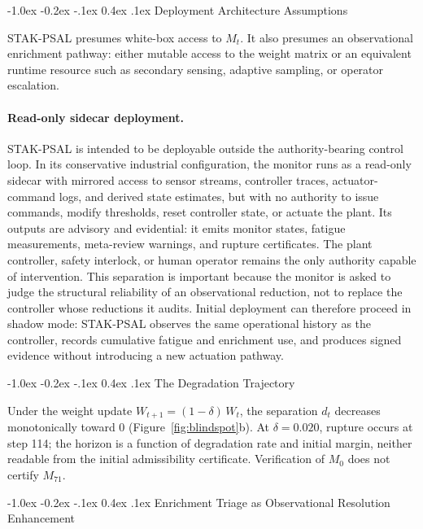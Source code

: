 \documentclass{llncs}
\makeatletter
\renewcommand\subsection{\@startsection{subsection}{2}{\z@}%
  {-1.0ex \@plus -0.2ex \@minus -.1ex}%
  {0.4ex \@plus .1ex}%
  {\normalfont\normalsize\bfseries}}
\makeatother
\begin{document}
\subsection{Deployment Architecture Assumptions}
\label{sec:deploy-assumptions}

STAK-PSAL presumes white-box access to $M_t$. It also presumes an
observational enrichment pathway: either mutable access to the weight
matrix or an equivalent runtime resource such as secondary sensing,
adaptive sampling, or operator escalation.

\paragraph{Read-only sidecar deployment.}
STAK-PSAL is intended to be deployable outside the authority-bearing control loop. In its conservative industrial configuration, the monitor runs as a read-only sidecar with mirrored access to sensor streams, controller traces, actuator-command logs, and derived state estimates, but with no authority to issue commands, modify thresholds, reset controller state, or actuate the plant. Its outputs are advisory and evidential: it emits monitor states, fatigue measurements, meta-review warnings, and rupture certificates. The plant controller, safety interlock, or human operator remains the only authority capable of intervention. This separation is important because the monitor is asked to judge the structural reliability of an observational reduction, not to replace the controller whose reductions it audits. Initial deployment can therefore proceed in shadow mode: STAK-PSAL observes the same operational history as the controller, records cumulative fatigue and enrichment use, and produces signed evidence without introducing a new actuation pathway.

\subsection{The Degradation Trajectory}

Under the weight update $W_{t+1} = (1-\delta)\,W_t$, the separation
$d_t$ decreases monotonically toward 0 (Figure~\ref{fig:blindspot}b).
At $\delta = 0.020$, rupture occurs at step 114; the horizon is a function
of degradation rate and initial margin, neither readable from the initial
admissibility certificate. Verification of $M_0$ does not certify $M_{71}$.

\subsection{Enrichment Triage as Observational Resolution Enhancement}
\end{document}
